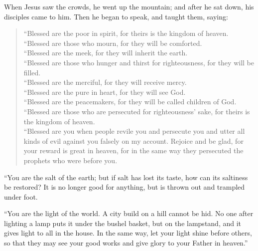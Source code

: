 \documentclass{memoir}
\begin{document}

When Jesus saw the crowds, he went up the mountain;
and after he sat down, his disciples came to him.
 Then he began to speak, and taught them, saying:

\begin{verse}
 ``Blessed are the poor in spirit, 
for theirs is the kingdom of heaven. \\
 ``Blessed are those who mourn, 
for they will be comforted. \\
 ``Blessed are the meek, 
for they will inherit the earth. \\
 ``Blessed are those who hunger and thirst for righteousness, 
for they will be filled. \\
 ``Blessed are the merciful, 
for they will receive mercy. \\
 ``Blessed are the pure in heart, 
for they will see God. \\
 ``Blessed are the peacemakers, 
for they will be called children of God. \\
 ``Blessed are those who are persecuted for righteousness' sake, 
for theirs is the kingdom of heaven. \\
 ``Blessed are you when people revile you and persecute you 
and utter all kinds of evil against you 
falsely on my account.
 Rejoice and be glad, for your reward is great in heaven, 
for in the same way they persecuted the prophets who were before you.
\end{verse}

 ``You are the salt of the earth; but if salt has lost its taste, how can its saltiness be restored?
It is no longer good for anything, but is thrown out and trampled under foot.

 ``You are the light of the world. 
A city build on a hill cannot be hid.
 No one after lighting a lamp puts it under the bushel basket, 
but on the lampstand, and it gives light to all in the house.
 In the same way, let your light shine before others,
so that they may see your good works and give glory to your Father in heaven.''
\end{document}
